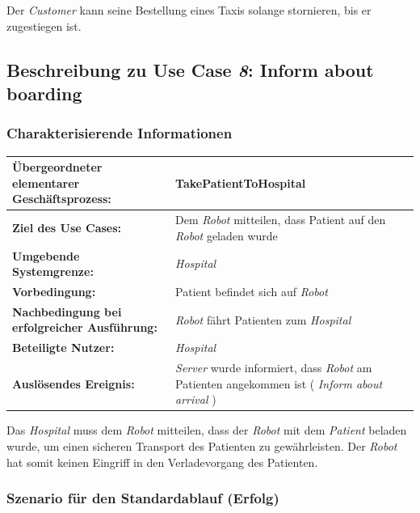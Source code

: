 			Der \emph{Customer} kann seine Bestellung eines Taxis solange stornieren, bis er zugestiegen ist.
			
		
		\subsection{Beschreibung zu Use Case \emph{8}: Inform about boarding}
			\subsubsection*{Charakterisierende Informationen}

			\begin{table}[H]
				\centering
				\begin{tabularx}{\textwidth}{|p{5cm}|X|}
				\hline
				\textbf{Übergeordneter elementarer Geschäftsprozess:} & TakePatientToHospital   \\ \hline
				\textbf{Ziel des Use Cases:} & Dem \emph{Robot} mitteilen, dass Patient auf den \emph{Robot} geladen wurde \\ \hline
				\textbf{Umgebende Systemgrenze:} & \emph{Hospital} \\ \hline
				\textbf{Vorbedingung:} & Patient befindet sich auf \emph{Robot}\\ \hline
				\textbf{Nachbedingung bei erfolgreicher Ausführung:} & \emph{Robot} fährt Patienten zum \emph{Hospital} \\ \hline
				\textbf{Beteiligte Nutzer:} & \emph{Hospital}\\ \hline
				\textbf{Auslösendes Ereignis:} & \emph{Server} wurde informiert, dass \emph{Robot} am Patienten angekommen ist (\textit{ \glqq Inform about arrival \grqq }) \\
				\hline
				\end{tabularx}
			\end{table}
			
			Das \emph{Hospital} muss dem \emph{Robot} mitteilen, dass der \emph{Robot} mit dem \emph{Patient} beladen wurde, um einen sicheren Transport des Patienten zu gewährleisten. 
			Der \emph{Robot} hat somit keinen Eingriff in den Verladevorgang des Patienten.

			\subsubsection*{Szenario für den Standardablauf (Erfolg)}

